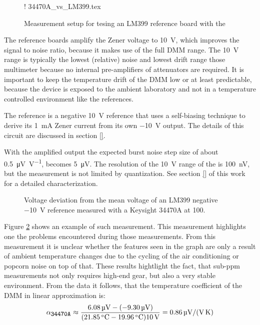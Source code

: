 \begin{figure}[ht]
    \centering
    \resizebox {0.8\textwidth} {!} {
        {34470A_vs_LM399.tex}
    } %
    \caption{Measurement setup for tesing an LM399 reference board with the }
    \label{fig:lm399_vs_34470a_setup}
\end{figure}

The reference boards amplify the Zener voltage to \qty{10}{\volt}, which improves the signal to noise ratio, because it makes use of the full DMM range. The \qty{10}{\volt} range is typically the lowest (relative) noise and lowest drift range those multimeter because no internal pre-amplifiers of attenuators are required. It is important to keep the temperature drift of the DMM low or at least predictable, because the device is exposed to the ambient laboratory and not in a temperature controlled environment like the references.

\newpage
The reference is a negative \qty{10}{\volt} reference that uses a self-biasing technique to derive its \qty{1}{\mA} Zener current from its own \qty{-10}{\volt} output. The details of this circuit are discussed in section \ref{}.


With the amplified output the expected burst noise step size of about \qty[per-mode=symbol]{0.5}{\micro\volt \per \volt}, becomes \qty{5}{\micro\volt}. The resolution of the \qty{10}{\volt} range of the  is \qty{100}{\nano \volt}, but the measurement is not limited by quantization. See section \ref{} of this work for a detailed characterization.

\begin{figure}[ht]
    \centering
    
    \caption{Voltage deviation from the mean voltage of an LM399 negative \qty{-10}{\volt} reference measured with a Keysight 34470A at \qty{100}{\plc}.}
    \label{fig:lm399_vs_34470a}
\end{figure}

Figure \ref{fig:lm399_vs_34470a} shows an example of such measurement. This measurement highlights one the problems encountered during those measurements. From this measurement it is unclear whether the features seen in the graph are only a result of ambient temperature changes due to the cycling of the air conditioning or popcorn noise on top of that. These results hightlight the fact, that sub-\unit{ppm} measurements not only requires high-end gear, but also a very stable environment. From the data it follows, that the temperature coefficient of the DMM in linear approximation is:
\begin{equation}
    \alpha_{\texttt{\small 34470A}} \approx \frac{\qty{6.08}{\micro\volt}-(-\qty{9.30}{\micro\volt})}{(\qty{21.85}{\celsius}-\qty{19.96}{\celsius})\qty{10}{\volt}} = \qty[per-mode=symbol]{0.86}{\micro\volt \per \volt \per \kelvin}
\end{equation}

